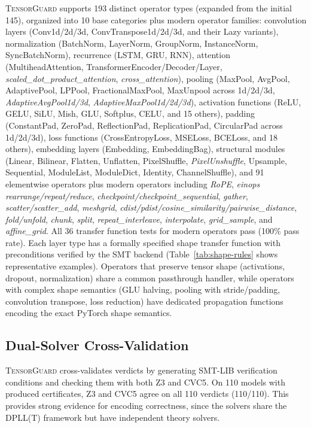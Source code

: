 \documentclass[11pt]{article}
\begin{document}
\textsc{TensorGuard} supports 193 distinct operator types
(expanded from the initial 145),
organized into 10 base categories plus modern operator families:
convolution layers (Conv1d/2d/3d, ConvTranspose1d/2d/3d, and their Lazy variants),
normalization (BatchNorm, LayerNorm, GroupNorm, InstanceNorm, SyncBatchNorm),
recurrence (LSTM, GRU, RNN),
attention (MultiheadAttention, TransformerEncoder/Decoder/Layer,
\emph{scaled\_dot\_product\_attention}, \emph{cross\_attention}),
pooling (MaxPool, AvgPool, AdaptivePool, LPPool, FractionalMaxPool, MaxUnpool across 1d/2d/3d,
\emph{AdaptiveAvgPool1d/3d}, \emph{AdaptiveMaxPool1d/2d/3d}),
activation functions (ReLU, GELU, SiLU, Mish, GLU, Softplus, CELU, and 15 others),
padding (ConstantPad, ZeroPad, ReflectionPad, ReplicationPad, CircularPad across 1d/2d/3d),
loss functions (CrossEntropyLoss, MSELoss, BCELoss, and 18 others),
embedding layers (Embedding, EmbeddingBag),
structural modules (Linear, Bilinear, Flatten, Unflatten, PixelShuffle, \emph{PixelUnshuffle},
Upsample, Sequential, ModuleList, ModuleDict, Identity, ChannelShuffle),
and 91 elementwise operators plus modern operators including
\emph{RoPE}, \emph{einops rearrange/repeat/reduce},
\emph{checkpoint/checkpoint\_sequential},
\emph{gather}, \emph{scatter/scatter\_add}, \emph{meshgrid},
\emph{cdist/pdist/cosine\_similarity/pairwise\_distance},
\emph{fold/unfold}, \emph{chunk}, \emph{split},
\emph{repeat\_interleave}, \emph{interpolate}, \emph{grid\_sample},
and \emph{affine\_grid}.
All 36 transfer function tests for modern operators pass (100\% pass rate).
Each layer type has a formally specified shape transfer function
with preconditions verified by the SMT backend (Table~\ref{tab:shape-rules}
shows representative examples).
Operators that preserve tensor shape
(activations, dropout, normalization) share a common passthrough handler,
while operators with complex shape semantics (GLU halving, pooling with
stride/padding, convolution transpose, loss reduction) have dedicated
propagation functions encoding the exact PyTorch shape semantics.

\subsection{Dual-Solver Cross-Validation}

\textsc{TensorGuard} cross-validates verdicts by generating SMT-LIB
verification conditions and checking them with both Z3 and CVC5.
On 110 models with produced certificates, Z3 and CVC5 agree on
all 110 verdicts (110/110).  This provides strong evidence for
encoding correctness, since the solvers share the DPLL(T) framework
but have independent theory solvers.
\end{document}

